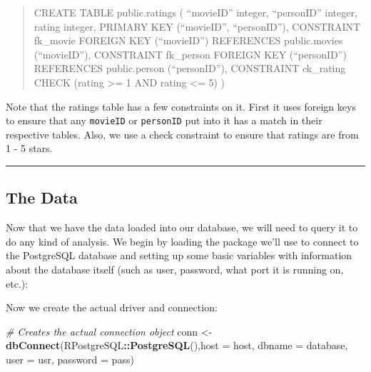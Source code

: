 \documentclass[]{article}
\newenvironment{Shaded}{\begin{snugshade}}{\end{snugshade}}
\newcommand{\KeywordTok}[1]{\textcolor[rgb]{0.13,0.29,0.53}{\textbf{#1}}}
\newcommand{\DataTypeTok}[1]{\textcolor[rgb]{0.13,0.29,0.53}{#1}}
\newcommand{\DecValTok}[1]{\textcolor[rgb]{0.00,0.00,0.81}{#1}}
\newcommand{\StringTok}[1]{\textcolor[rgb]{0.31,0.60,0.02}{#1}}
\newcommand{\CommentTok}[1]{\textcolor[rgb]{0.56,0.35,0.01}{\textit{#1}}}
\newcommand{\OperatorTok}[1]{\textcolor[rgb]{0.81,0.36,0.00}{\textbf{#1}}}
\newcommand{\NormalTok}[1]{#1}
\begin{document}
\begin{quote}
CREATE TABLE public.ratings ( ``movieID'' integer, ``personID'' integer,
rating integer, PRIMARY KEY (``movieID'', ``personID''), CONSTRAINT
fk\_movie FOREIGN KEY (``movieID'') REFERENCES public.movies
(``movieID''), CONSTRAINT fk\_person FOREIGN KEY (``personID'')
REFERENCES public.person (``personID''), CONSTRAINT ck\_rating CHECK
(rating \textgreater{}= 1 AND rating \textless{}= 5) )
\end{quote}

Note that the ratings table has a few constraints on it. First it uses
foreign keys to ensure that any \texttt{movieID} or \texttt{personID}
put into it has a match in their respective tables. Also, we use a check
constraint to ensure that ratings are from 1 - 5 stars.

\begin{center}\rule{0.5\linewidth}{\linethickness}\end{center}

\subsection{The Data}\label{the-data}

Now that we have the data loaded into our database, we will need to
query it to do any kind of analysis. We begin by loading the package
we'll use to connect to the PostgreSQL database and setting up some
basic variables with information about the database itself (such as
user, password, what port it is running on, etc.):

\begin{Shaded}
\end{Shaded}

Now we create the actual driver and connection:

\begin{Shaded}
\begin{Highlighting}[]
\CommentTok{# Creates the actual connection object}
\NormalTok{conn <-}\StringTok{ }\KeywordTok{dbConnect}\NormalTok{(RPostgreSQL}\OperatorTok{::}\KeywordTok{PostgreSQL}\NormalTok{(),}\DataTypeTok{host =}\NormalTok{ host, }\DataTypeTok{dbname =}\NormalTok{ database, }\DataTypeTok{user =}\NormalTok{ usr, }\DataTypeTok{password =}\NormalTok{ pass)}
\end{Highlighting}
\end{Shaded}
\end{document}
